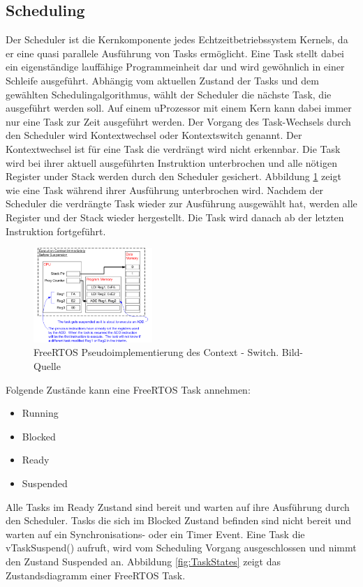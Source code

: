 \subsection{Scheduling}
\label{Scheduling}
Der Scheduler ist die Kernkomponente jedes Echtzeitbetriebssystem Kernels, da er eine quasi parallele Ausführung von Tasks ermöglicht. Eine Task stellt dabei ein ei\-gen\-stän\-di\-ge lauffähige Programmeinheit dar und wird gewöhnlich in einer Schleife ausgeführt. Abhängig vom aktuellen Zustand der Tasks und dem gewählten Schedulingalgorithmus, wählt der Scheduler die nächste Task, die ausgeführt werden soll. Auf einem uProzessor mit einem Kern kann dabei immer nur eine Task zur Zeit ausgeführt werden. Der Vorgang des Task-Wechsels durch den Scheduler wird Kontextwechsel oder Kontextswitch genannt. Der Kontextwechsel ist für eine Task die verdrängt wird nicht erkennbar. Die Task wird bei ihrer aktuell ausgeführten Instruktion unterbrochen und alle nötigen Register under Stack werden durch den Scheduler gesichert. Abbildung \ref{fig:ContextSwitch} zeigt wie eine Task während ihrer Ausführung unterbrochen wird. Nachdem der Scheduler die verdrängte Task wieder zur Ausführung ausgewählt hat, werden alle Register und der Stack wieder hergestellt. Die Task wird danach ab der letzten Instruktion fortgeführt. 
\begin{figure}[ht!]
	\centering
		\includegraphics[width=0.4\textwidth]{Pictures/FreeRTOSOrg/ExeContext.png}
	\caption{FreeRTOS Pseudoimplementierung des Context - Switch. Bild-Quelle~\protect{} }
	\label{fig:ContextSwitch}
\end{figure}   
Folgende Zu\-stän\-de kann eine FreeRTOS Task annehmen: 
\begin{itemize}
	\item Running
	\item Blocked
	\item Ready
	\item Suspended
\end{itemize}
 Alle Tasks im Ready Zustand sind bereit und warten auf ihre Ausführung durch den Scheduler. Tasks die sich im Blocked Zustand befinden sind nicht bereit und warten auf ein Synchronisations- oder ein Timer Event. Eine Task die vTaskSuspend() aufruft, wird vom Scheduling Vorgang ausgeschlossen und nimmt den Zustand Suspended an. Abbildung \ref{fig:TaskStates} zeigt das Zustandsdiagramm einer FreeRTOS Task. 
